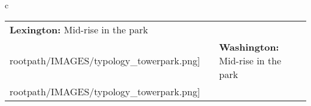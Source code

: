 \begin{table}[H]
        \begin{tabular}{c}
        \begin{tabular}{m{1.25in} m{2in} m{.1in} m{1.25in} m{2in}}
\textbf{Lexington:} {Mid-rise in the park} & \texttt{[image: \\rootpath/IMAGES/typology\_towerpark.png]} & & \textbf{Washington:} {Mid-rise in the park} & \texttt{[image: \\rootpath/IMAGES/typology\_towerpark.png]}
\end{tabular}\end{tabular}
        \end{table}